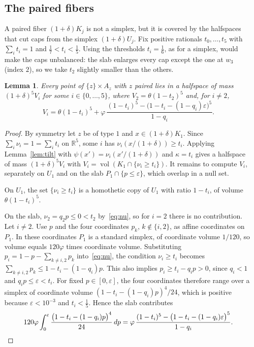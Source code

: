 \documentclass[11pt]{article}
\newtheorem{lemma}[theorem]{Lemma}
\newcommand{\R}{\mathbb{R}}
\newcommand{\1}{\mathbf{1}}
\DeclareMathOperator{\vol}{vol}
\begin{document}
\subsection{The paired fibers}

A paired fiber $(1+\delta)K_j$ is not a simplex, but it is covered by the halfspaces that cut caps from the simplex
$(1+\delta)U_j$. Fix positive rationals $t_0,\ldots,t_5$ with $\sum_it_i=1$ and $\frac17<t_i<\frac15$. Using the thresholds
$t_i=\frac16$, as for a simplex, would make the caps unbalanced: the slab enlarges every cap except the one at $w_3$
(index $2$), so we take $t_2$ slightly smaller than the others.

\begin{lemma}\label{lem:paired}
Every point of $\{z\}\times A_z$ with $z$ paired lies in a halfspace of mass $(1+\delta)^5V_i$ for some
$i\in\{0,\ldots,5\}$, where $V_2=\theta(1-t_2)^5$ and, for $i\ne2$,
\[
V_i=\theta(1-t_i)^5+\varphi\,\frac{(1-t_i)^5-\bigl(1-t_i-(1-q_i)\varepsilon\bigr)^5}{1-q_i}.
\]
\end{lemma}

\begin{proof}
By symmetry let $z$ be of type $1$ and $x\in(1+\delta)K_1$. Since $\sum_i\nu_i=1=\sum_it_i$ on $\R^5$, some $i$ has
$\nu_i(x/(1+\delta))\ge t_i$. Applying Lemma~\ref{lem:tilt} with $\psi(x')=\nu_i(x'/(1+\delta))$ and $\kappa=t_i$ gives a
halfspace of mass $(1+\delta)^5V_i$ with $V_i=\vol(K_1\cap\{\nu_i\ge t_i\})$. It remains to compute $V_i$, separately on
$U_1$ and on the slab $P_1\cap\{p\le\varepsilon\}$, which overlap in a null set.

On $U_1$, the set $\{\nu_i\ge t_i\}$ is a homothetic copy of $U_1$ with ratio $1-t_i$, of volume $\theta(1-t_i)^5$.

On the slab, $\nu_2=q_2p\le0<t_2$ by~\eqref{eq:nu}, so for $i=2$ there is no contribution. Let $i\ne2$. Use $p$ and the four
coordinates $p_k$, $k\notin\{i,2\}$, as affine coordinates on $P_1$. In these coordinates $P_1$ is a standard simplex, of
coordinate volume $1/120$, so volume equals $120\varphi$ times coordinate volume. Substituting
$p_i=1-p-\sum_{k\ne i,2}p_k$ into~\eqref{eq:nu}, the condition $\nu_i\ge t_i$ becomes
$\sum_{k\ne i,2}p_k\le1-t_i-(1-q_i)p$. This also implies $p_i\ge t_i-q_ip>0$, since $q_i<1$ and $q_ip\le\varepsilon<t_i$.
For fixed $p\in[0,\varepsilon]$, the four coordinates therefore range over a simplex of coordinate volume
$(1-t_i-(1-q_i)p)^4/24$, which is positive because $\varepsilon<10^{-3}$ and $t_i<\frac15$. Hence the slab contributes
\[
120\varphi\int_0^\varepsilon\frac{\bigl(1-t_i-(1-q_i)p\bigr)^4}{24}\,dp
=\varphi\,\frac{(1-t_i)^5-\bigl(1-t_i-(1-q_i)\varepsilon\bigr)^5}{1-q_i}.\qedhere
\]
\end{proof}
\end{document}
